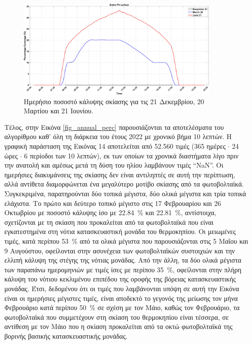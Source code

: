 \documentclass[12pt, a4paper]{report} %
\newcommand{\english}{\foreignlanguage{english}}
\begin{document}
\begin{figure}[ht]%
    \centering
    \includegraphics[width=0.9\textwidth]{Figures/diurnal_perc.jpg}
    \caption{Ημερήσιο ποσοστό κάλυψης σκίασης για τις 21 Δεκεμβρίου, 20 Μαρτίου και 21 Ιουνίου.}
    \label{fig_diurnal_perc}
\end{figure}

Τέλος, στην Εικόνα \ref{fig_annual_perc} παρουσιάζονται τα αποτελέσματα του αλγορίθμου καθ' όλη τη διάρκεια του έτους 2022 
με χρονικό βήμα 10 λεπτών. Η γραφική παράσταση της Εικόνας 14 αποτελείται από 52.560 τιμές (365 ημέρες $\cdot$ 24 ώρες 
$\cdot$ 6 περίοδοι των 10 λεπτών), εκ των οποίων τα χρονικά διαστήματα λίγο πριν την ανατολή και αμέσως μετά τη δύση του 
ηλίου λαμβάνουν τιμές “\english{NaN}”. Οι ημερήσιες διακυμάνσεις της σκίασης δεν είναι αντιληπτές σε αυτή την περίπτωση, 
αλλά αντίθετα διαμορφώνεται ένα μεγαλύτερο μοτίβο σκίασης από τα φωτοβολταϊκά. Συγκεκριμένα, παρατηρούνται δύο τοπικά 
μέγιστα, δύο ολικά μέγιστα και τρία τοπικά ελάχιστα. Το πρώτο και δεύτερο τοπικό μέγιστο στις 17 Φεβρουαρίου και 26 
Οκτωβρίου με ποσοστό κάλυψης ίσο με \SI{22,84}{\percent} και \SI{22,81}{\percent}, αντίστοιχα, σχετίζονται με τη σκίαση 
που προκαλείται από τα φωτοβολταϊκά που είναι εγκατεστημένα στη νότια κατασκευαστική μονάδα του θερμοκηπίου. Οι μειωμένες 
τιμές, κατά περίπου \SI{53}{\percent} από τα ολικά μέγιστα που παρουσιάζονται στις 5 Μαΐου και 9 Αυγούστου, οφείλονται στην 
ασυνέχεια των φωτοβολταϊκών συστοιχιών και την ελλιπή κάλυψη της στέγης της νότιας μονάδας. Από την άλλη, τα δύο ολικά 
μέγιστα των παραπάνω ημερομηνιών με τιμές ίσες με περίπου \SI{35}{\percent}, οφείλονται στην πλήρη κάλυψη του νότιου κεκλιμένου 
επιπέδου της οροφής της βόρειας κατασκευαστικής μονάδας. Έτσι, δεδομένου ότι οι τιμές που λαμβάνονται υπόψη σε αυτή την 
Εικόνα είναι οι ημερήσιες μέγιστες τιμές, είναι αποδεκτό το γεγονός της μείωσης τον μήνα Φεβρουάριο κατά περίπου 
\SI{50}{\percent} σε σχέση με τον Μάιο, καθώς τον Φεβρουάριο, τα φωτοβολταϊκά που συμμετέχουν στη σκίαση του θερμοκηπίου είναι 
τέσσερα, σε αντίθεση με τον Μάιο που η σκίαση προκαλείται από τα οκτώ φωτοβολταϊκά της βορινής βασικής κατασκευαστικής μονάδας.
\end{document}
